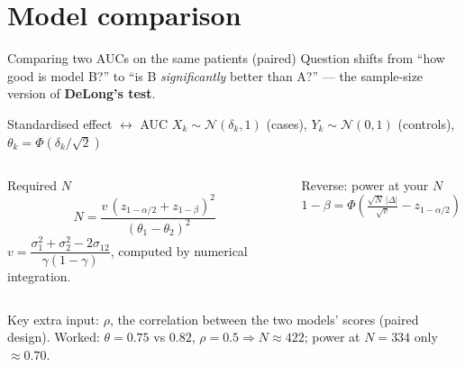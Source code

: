 \documentclass[10pt,aspectratio=169]{beamer}
\begin{document}
\section{Model comparison }
\begin{frame}{Comparing two AUCs on the same patients (paired)}
  Question shifts from ``how good is model B?'' to ``is B \emph{significantly} better than A?''
  --- the sample-size version of \textbf{DeLong's test}.
  \vfill
  \begin{block}{Standardised effect $\leftrightarrow$ AUC}
    $X_k\sim\mathcal N(\delta_k,1)$ (cases), $Y_k\sim\mathcal N(0,1)$ (controls), \quad
    $\theta_k=\Phi\!\left(\delta_k/\sqrt2\right)$
  \end{block}
  \begin{columns}[t]
      \begin{block}{Required $N$}
        \[ N=\frac{v\,(z_{1-\alpha/2}+z_{1-\beta})^2}{(\theta_1-\theta_2)^2} \]
        \footnotesize $v=\dfrac{\sigma_1^2+\sigma_2^2-2\sigma_{12}}{\gamma(1-\gamma)}$, computed by numerical integration.
      \end{block}
      \begin{block}{Reverse: power at your $N$}
        \[ 1-\beta=\Phi\!\left(\tfrac{\sqrt N\,|\Delta|}{\sqrt v}-z_{1-\alpha/2}\right) \]
      \end{block}
  \end{columns}
  \vfill
  {\scriptsize Key extra input: $\rho$, the correlation between the two models' scores (paired design). Worked: $\theta{=}0.75$ vs $0.82$, $\rho{=}0.5 \Rightarrow N\approx 422$; power at $N{=}334$ only $\approx 0.70$.}
\end{frame}

\end{document}
